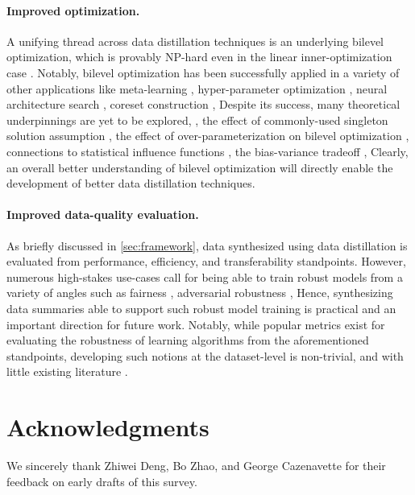 \documentclass[10pt]{article} %
\begin{document}
\paragraph{Improved optimization.} A unifying thread across data distillation techniques is an underlying bilevel optimization, which is provably NP-hard even in the linear inner-optimization case \citep{bilevel_np_hard}. Notably, bilevel optimization has been successfully applied in a variety of other applications like meta-learning \citep{maml, metasgd}, hyper-parameter optimization \citep{hyperopt_maclaurin, hyperopt_vicol}, neural architecture search \citep{darts_nas}, coreset construction \citep{bilevel_coresets, bilevel_coresets_bayesian}, \etc Despite its success, many theoretical underpinnings are yet to be explored, \eg, the effect of commonly-used singleton solution assumption \citep{singleton_bilevel}, the effect of over-parameterization on bilevel optimization \citep{bilevel_implicit_bias}, connections to statistical influence functions \citep{influence_functions}, the bias-variance tradeoff \citep{bilevel_bias_variance}, \etc Clearly, an overall better understanding of bilevel optimization will directly enable the development of better data distillation techniques.

\paragraph{Improved data-quality evaluation.} As briefly discussed in \cref{sec:framework}, data synthesized using data distillation is evaluated from performance, efficiency, and transferability standpoints. However, numerous high-stakes use-cases call for being able to train robust models from a variety of angles such as fairness \citep{fair_ml}, adversarial robustness \citep{adv_ml}, \etc Hence, synthesizing data summaries able to support such robust model training is practical and an important direction for future work. Notably, while popular metrics exist for evaluating the robustness of learning algorithms from the aforementioned standpoints, developing such notions at the dataset-level is non-trivial, and with little existing literature \citep{fairness_dpp, adv_sampling}.

\section*{Acknowledgments}
We sincerely thank Zhiwei Deng, Bo Zhao, and George Cazenavette for their feedback on early drafts of this survey.

{\small
}


\newpage

\appendix


\end{document}
